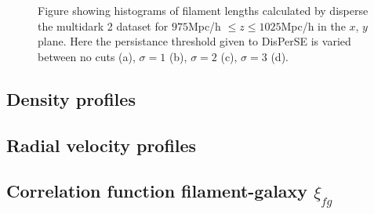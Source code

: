 \begin{figure}[htbp]
    \hspace{1em}%
    \hspace{1em}%
    \caption{Figure showing histograms of filament lengths calculated by disperse the multidark 2 dataset for $975$Mpc/h $\leq z\leq1025$Mpc/h in the $x$, $y$ plane. Here the persistance threshold given to DisPerSE is varied between no cuts (a), $\sigma=1$ (b), $\sigma=2$ (c), $\sigma=3$ (d).}
\end{figure}
\subsection{Density profiles}
\subsection{Radial velocity profiles}
\subsection{Correlation function filament-galaxy $\xi_{fg}$}
